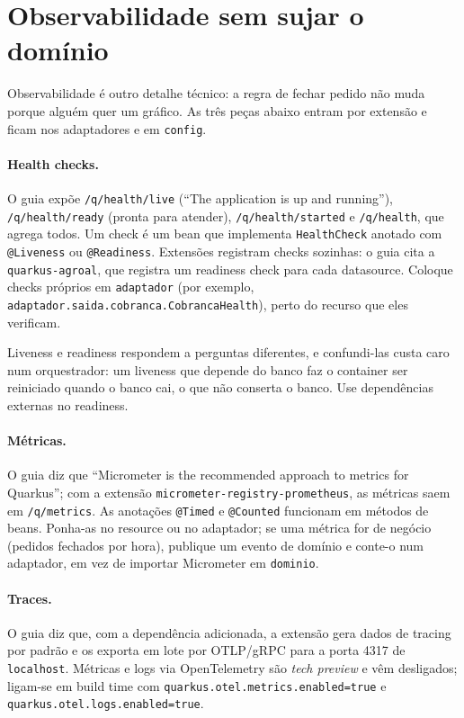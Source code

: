 \section{Observabilidade sem sujar o domínio}
\label{sec:observabilidade-quarkus}

Observabilidade é outro detalhe técnico: a regra de fechar pedido não
muda porque alguém quer um gráfico. As três peças abaixo entram por
extensão e ficam nos adaptadores e em \texttt{config}.

\paragraph{Health checks.}
O guia  expõe \texttt{/q/health/live}
(\enquote{The application is up and running}),
\texttt{/q/health/ready} (pronta para atender), \texttt{/q/health/started}
e \texttt{/q/health}, que agrega todos. Um check é um bean que implementa
\texttt{HealthCheck} anotado com \texttt{@Liveness} ou \texttt{@Readiness}.
Extensões registram checks sozinhas: o guia cita a
\texttt{quarkus-agroal}, que registra um readiness check para cada
datasource. Coloque checks próprios em \texttt{adaptador} (por exemplo,
\texttt{adaptador.saida.cobranca.CobrancaHealth}), perto do recurso que
eles verificam.

Liveness e readiness respondem a perguntas diferentes, e confundi-las
custa caro num orquestrador: um liveness que depende do banco faz o
container ser reiniciado quando o banco cai, o que não conserta o
banco. Use dependências externas no readiness.

\paragraph{Métricas.}
O guia  diz que \enquote{Micrometer is
the recommended approach to metrics for Quarkus}; com a extensão
\texttt{micrometer-registry-prometheus}, as métricas saem em
\texttt{/q/metrics}. As anotações \texttt{@Timed} e \texttt{@Counted}
funcionam em métodos de beans. Ponha-as no resource ou no adaptador;
se uma métrica for de negócio (pedidos fechados por hora), publique um
evento de domínio e conte-o num adaptador, em vez de importar Micrometer
em \texttt{dominio}.

\paragraph{Traces.}
O guia  diz que, com a dependência
adicionada, a extensão gera dados de tracing por padrão e os exporta em
lote por OTLP/gRPC para a porta 4317 de \texttt{localhost}. Métricas e logs
via OpenTelemetry são \emph{tech preview} e vêm desligados; ligam-se em
build time com \texttt{quarkus.otel.metrics.enabled=true} e
\texttt{quarkus.otel.logs.enabled=true}.


